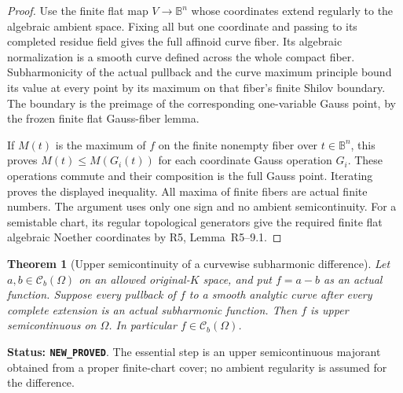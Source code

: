 \documentclass[11pt,a4paper]{article}
\numberwithin{equation}{section}
\newtheorem{theorem}{Theorem}[section]
\theoremstyle{definition}
\theoremstyle{remark}
\begin{document}
\begin{proof}
Use the finite flat map $V\to\mathbb B^n$ whose coordinates extend
regularly to the algebraic ambient space. Fixing all but one coordinate
and passing to its completed residue field gives the full affinoid
curve fiber. Its algebraic normalization is a smooth curve defined
across the whole compact fiber. Subharmonicity of the actual pullback
and the curve maximum principle bound its value at every point by its
maximum on that fiber's finite Shilov boundary. The boundary is the
preimage of the corresponding one-variable Gauss point, by the frozen
finite flat Gauss-fiber lemma.

If $M(t)$ is the maximum of $f$ on the finite nonempty fiber over
$t\in\mathbb B^n$, this proves $M(t)\le M(G_i(t))$ for each
coordinate Gauss operation $G_i$. These operations commute and their
composition is the full Gauss point. Iterating proves the displayed
inequality. All maxima of finite fibers are actual finite numbers.
The argument uses only one sign and no ambient semicontinuity.
For a semistable chart, its regular topological generators give the
required finite flat algebraic Noether coordinates by R5,
Lemma~\textup{R5--9.1}.
\end{proof}

\begin{theorem}[Upper semicontinuity of a curvewise subharmonic difference]
\label{thm:r6-dsh-curvewise-usc}
Let $a,b\in\mathcal C_b(\Omega)$ on an allowed original-$K$ space,
and put $f=a-b$ as an actual function. Suppose every pullback of $f$
to a smooth analytic curve after every complete extension is an actual
subharmonic function. Then $f$ is upper semicontinuous on $\Omega$.
In particular $f\in\mathcal C_b(\Omega)$.
\end{theorem}

\noindent\textbf{Status: \texttt{NEW\_PROVED}}. The essential
step is an upper semicontinuous majorant obtained from a proper
finite-chart cover; no ambient regularity is assumed for the difference.
\end{document}
